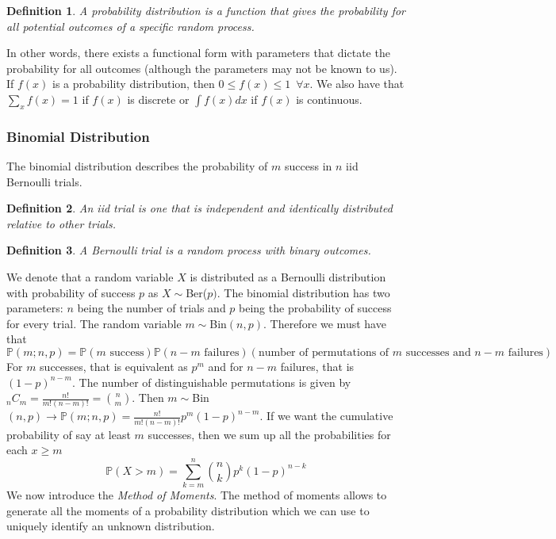 \documentclass{article}
\newcommand{\p}{\mathbb{P}}
\newtheorem{definition}{Definition}[section]
\begin{document}
\begin{definition}
    A \emph{probability distribution} is a function that gives the probability for all potential outcomes of a specific random process.
\end{definition}
In other words, there exists a functional form with parameters that dictate the probability for all outcomes (although the parameters may not be known to us). If $f(x)$ is a probability distribution, then $0\leq f(x)\leq 1 \,\,\, \forall x$. We also have that $\displaystyle{\sum_x}f(x)=1$ if $f(x)$ is discrete or $\displaystyle{\int f(x)dx}$ if $f(x)$ is continuous.
\subsubsection{Binomial Distribution}
The binomial distribution describes the probability of $m$ success in $n$ iid Bernoulli trials. 
\begin{definition}
    An \emph{iid} trial is one that is independent and identically distributed relative to other trials.
\end{definition}
\begin{definition}
    A \emph{Bernoulli} trial is a random process with binary outcomes.
\end{definition}
We denote that a random variable $X$ is distributed as a Bernoulli distribution with probability of success $p$ as $X \sim $Ber($p)$. The binomial distribution has two parameters: $n$ being the number of trials and $p$ being the probability of success for every trial. The random variable $m \sim $Bin$(n,p)$. Therefore we must have that 
\begin{equation*}
    \p(m;n,p) = \p(m \text{ success})\p(n-m\text{ failures})(\text{number of permutations of }m\text{ successes and }n-m \text{ failures})
\end{equation*}
For $m$ successes, that is equivalent as $p^m$ and  for $n-m$ failures, that is $(1-p)^{n-m}$. The number of distinguishable permutations is given by $_nC_m = \frac{n!}{m!(n-m)!} = \binom{n}{m}$. Then $m\sim $Bin$(n,p) \to \p(m;n,p) = \frac{n!}{m!(n-m)!}p^m(1-p)^{n-m}$. If we want the cumulative probability of say at least $m$ successes, then we sum up all the probabilities for each $x\geq m$
\begin{equation*}
    \p(X>m) = \sum^n_{k=m}\binom{n}{k} p^k(1-p)^{n-k}
\end{equation*}
We now introduce the \emph{Method of Moments}. The method of moments allows to generate all the moments of a probability distribution which we can use to uniquely identify an unknown distribution.
\end{document}
